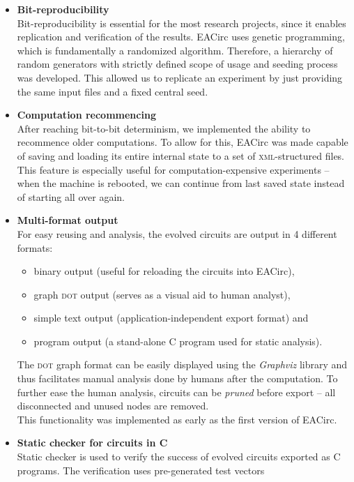 \documentclass[12pt,twoside]{fithesis2}		%
\renewcommand{\_}{\leavevmode \kern0.0em\vbox{\hrule width0.4em}}
\newcommand{\squarebullet}{\textcolor{black}{\raisebox{0.15em}{\rule{4pt}{4pt}}}}
\newenvironment{myItemize}{
  \begin{itemize}[leftmargin=2em,rightmargin=1em,itemsep=\parskip ,parsep=0em,topsep=0em,partopsep=0em]
  \renewcommand{\labelitemi}{\squarebullet}
  \renewcommand{\labelitemii}{$\diamond$}
}{
  \end{itemize}
}
\begin{document}
\begin{myItemize}
\item \textbf{Bit-reproducibility}\\
Bit-reproducibility is essential for the most research projects, since it enables replication and verification of the results.
EACirc uses genetic programming, which is fundamentally a randomized algorithm. Therefore, a hierarchy of random
generators with strictly defined scope of usage and seeding process was developed. This allowed us to replicate an experiment
by just providing the same input files and a fixed central seed.
\item \textbf{Computation recommencing}\\
After reaching bit-to-bit determinism, we implemented the ability to recommence older computations. 
To allow for this, EACirc was made capable of saving and loading its entire internal state to a set of \textsc{xml}-structured files.
This feature is especially useful for computation-expensive experiments -- when the machine is rebooted, we can continue from 
last saved state instead of starting all over again.
\item \textbf{Multi-format output}\\
For easy reusing and analysis, the evolved circuits are output in 4 different formats:
\begin{myItemize}
\item binary output (useful for reloading the circuits into EACirc),
\item graph \textsc{dot} output (serves as a visual aid to human analyst),
\item simple text output (application-independent export format) and
\item program output (a stand-alone C program used for static analysis).
\end{myItemize}
\noindent
The \textsc{dot} graph format can be easily displayed using the \textit{Graphviz} library \parencite{graphviz} and thus 
facilitates manual analysis done by humans after the computation.
To further ease the human analysis, circuits can be \textit{pruned} before export -- all disconnected and unused nodes are removed.\\
This functionality was implemented as early as the first version of EACirc. 
\item \textbf{Static checker for circuits in C}\\
Static checker is used to verify the success of evolved circuits exported as C programs. 
The verification uses pre-generated test vectors

\end{myItemize}
\end{document}
